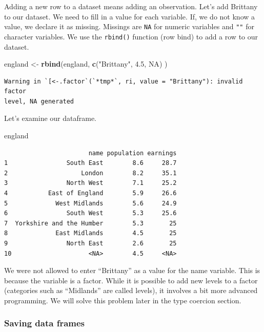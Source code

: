 \documentclass[]{article}
\newenvironment{Shaded}{\begin{snugshade}}{\end{snugshade}}
\newcommand{\FloatTok}[1]{\textcolor[rgb]{0.00,0.00,0.81}{#1}}
\newcommand{\KeywordTok}[1]{\textcolor[rgb]{0.13,0.29,0.53}{\textbf{#1}}}
\newcommand{\NormalTok}[1]{#1}
\newcommand{\OtherTok}[1]{\textcolor[rgb]{0.56,0.35,0.01}{#1}}
\newcommand{\StringTok}[1]{\textcolor[rgb]{0.31,0.60,0.02}{#1}}
\begin{document}
Adding a new row to a dataset means adding an observation. Let's add Brittany to our dataset. We need to fill in a value for each variable. If, we do not know a value, we declare it as missing. Missings are \texttt{NA} for numeric variables and \texttt{""} for character variables. We use the \texttt{rbind()} function (row bind) to add a row to our dataset.

\begin{Shaded}
\begin{Highlighting}[]
\NormalTok{england <-}\StringTok{ }\KeywordTok{rbind}\NormalTok{(england,  }\KeywordTok{c}\NormalTok{(}\StringTok{"Brittany"}\NormalTok{, }\FloatTok{4.5}\NormalTok{, }\OtherTok{NA}\NormalTok{) )}
\end{Highlighting}
\end{Shaded}

\begin{verbatim}
Warning in `[<-.factor`(`*tmp*`, ri, value = "Brittany"): invalid factor
level, NA generated
\end{verbatim}

Let's examine our dataframe.

\begin{Shaded}
\begin{Highlighting}[]
\NormalTok{england}
\end{Highlighting}
\end{Shaded}

\begin{verbatim}
                       name population earnings
1                South East        8.6     28.7
2                    London        8.2     35.1
3                North West        7.1     25.2
4           East of England        5.9     26.6
5             West Midlands        5.6     24.9
6                South West        5.3     25.6
7  Yorkshire and the Humber        5.3       25
8             East Midlands        4.5       25
9                North East        2.6       25
10                     <NA>        4.5     <NA>
\end{verbatim}

We were not allowed to enter ``Brittany'' as a value for the name variable. This is because the variable is a factor. While it is possible to add new levels to a factor (categories such as ``Midlands'' are called levels), it involves a bit more advanced programming. We will solve this problem later in the type coercion section.

\hypertarget{saving-data-frames}{%
\subsubsection{Saving data frames}\label{saving-data-frames}}
\end{document}
